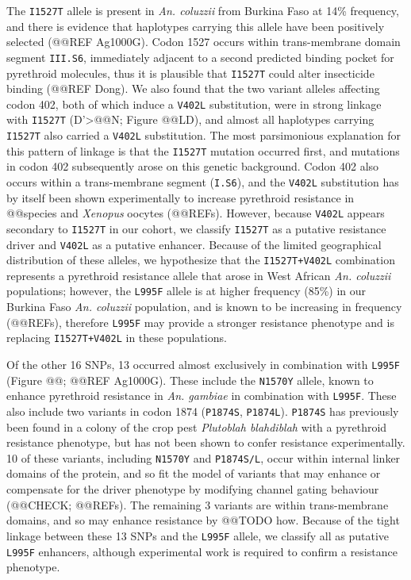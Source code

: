 \documentclass[a4paper,11pt,abstracton]{scrartcl}
\begin{document}
The \texttt{I1527T} allele is present in \textit{An. coluzzii} from Burkina Faso at 14\% frequency, and there is evidence that haplotypes carrying this allele have been positively selected (@@REF Ag1000G).
%
Codon 1527 occurs within trans-membrane domain segment \texttt{III.S6}, immediately adjacent to a second predicted binding pocket for pyrethroid molecules, thus it is plausible that \texttt{I1527T} could alter insecticide binding (@@REF Dong).
%
We also found that the two variant alleles affecting codon 402, both of which induce a \texttt{V402L} substitution, were in strong linkage with \texttt{I1527T} (D'>@@N; Figure @@LD), and almost all haplotypes carrying \texttt{I1527T} also carried a \texttt{V402L} substitution.
%
The most parsimonious explanation for this pattern of linkage is that the \texttt{I1527T} mutation occurred first, and mutations in codon 402 subsequently arose on this genetic background.
%
Codon 402 also occurs within a trans-membrane segment (\texttt{I.S6}), and the \texttt{V402L} substitution has by itself been shown experimentally to increase pyrethroid resistance in @@species and \textit{Xenopus} oocytes (@@REFs).
%
However, because \texttt{V402L} appears secondary to \texttt{I1527T} in our cohort, we classify \texttt{I1527T} as a putative resistance driver and \texttt{V402L} as a putative enhancer.
%
Because of the limited geographical distribution of these alleles, we hypothesize that the \texttt{I1527T+V402L} combination represents a pyrethroid resistance allele that arose in West African \textit{An. coluzzii} populations; however, the \texttt{L995F} allele is at higher frequency (85\%) in our Burkina Faso \textit{An. coluzzii} population, and is known to be increasing in frequency (@@REFs), therefore \texttt{L995F} may provide a stronger resistance phenotype and is replacing \texttt{I1527T+V402L} in these populations.


Of the other 16 SNPs, 13 occurred almost exclusively in combination with \texttt{L995F} (Figure @@; @@REF Ag1000G).
%
These include the \texttt{N1570Y} allele, known to enhance pyrethroid resistance in \textit{An. gambiae} in combination with \texttt{L995F}.
%
These also include two variants in codon 1874 (\texttt{P1874S}, \texttt{P1874L}). \texttt{P1874S} has previously been found in a colony of the crop pest \textit{Plutoblah blahdiblah} with a pyrethroid resistance phenotype, but has not been shown to confer resistance experimentally.
%
10 of these variants, including \texttt{N1570Y} and \texttt{P1874S/L}, occur within internal linker domains of the protein, and so fit the model of variants that may enhance or compensate for the driver phenotype by modifying channel gating behaviour (@@CHECK; @@REFs).
%
The remaining 3 variants are within trans-membrane domains, and so may enhance resistance by @@TODO how.
%
Because of the tight linkage between these 13 SNPs and the \texttt{L995F} allele, we classify all as putative \texttt{L995F} enhancers, although experimental work is required to confirm a resistance phenotype.
\end{document}
